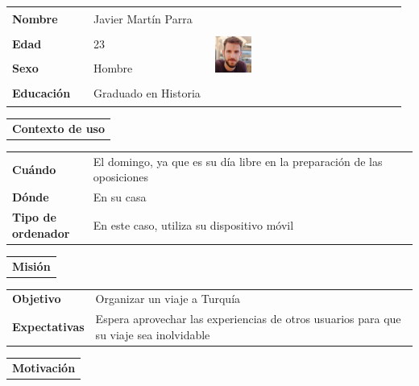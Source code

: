 \documentclass[11pt]{article}
\begin{document}
\begin{table}[H]
  \centering
  \begin{tabular}{p{0.2\linewidth}|p{0.3\linewidth}p{0.475\linewidth}}
    \toprule
    \textbf{Nombre} & Javier Martín Parra &\multirow{4}{*}{\begin{minipage}{1.\textwidth}\includegraphics[width=0.2\textwidth, height=30mm]{../Imagenes/Javier}\end{minipage}}\\
    \textbf{Edad} & 23 & \\
    \textbf{Sexo} & Hombre & \\
    \textbf{Educación} & Graduado en Historia & \\
    \bottomrule
  \end{tabular}

  \begin{tabular}{l}
    \textbf{Contexto de uso} 
  \end{tabular}
  
  \begin{tabular}{p{0.2\linewidth}|p{0.8\linewidth}}
    \toprule
    \textbf{Cuándo} & El domingo, ya que es su día libre en la preparación de las oposiciones\\
    \textbf{Dónde}  & En su casa\\
    \textbf{Tipo de ordenador} & En este caso, utiliza su dispositivo móvil\\
    \bottomrule
  \end{tabular}

  \begin{tabular}{l}
    \textbf{Misión} 
  \end{tabular}
  
  \begin{tabular}{p{0.2\linewidth}|p{0.8\linewidth}}
    \toprule
    \textbf{Objetivo} & Organizar un viaje a Turquía\\
    \textbf{Expectativas}  & Espera aprovechar las experiencias de otros usuarios para que su viaje sea inolvidable \\
    \bottomrule
  \end{tabular}

  \begin{tabular}{l}
    \textbf{Motivación} 
  \end{tabular}


\end{table}
\end{document}
